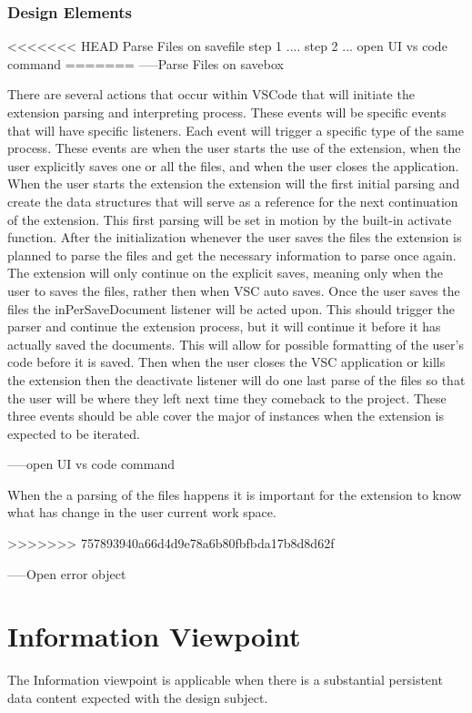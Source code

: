 \documentclass[letterpaper,10pt,titlepage,draftclsnofoot,onecolumn,onesided] {IEEEtran}
\begin{document}
\subsubsection{Design Elements}
<<<<<<< HEAD
	Parse Files on savefile
		step 1 ....
		step 2 ...
	open UI vs code command
=======
	-----Parse Files on savebox
	
There are several actions that occur within VSCode that will initiate the extension parsing and interpreting process.
These events will be specific events that will have specific listeners. 
Each event will trigger a specific type of the same process.
These events are when the user starts the use of the extension, when the user explicitly saves one or all the files, and when the user closes the application.
When the user starts the extension the extension will the first initial parsing and create the data structures that will serve as a reference for the next continuation of the extension.
This first parsing will be set in motion by the built-in activate function. 
After the initialization whenever the user saves the files the extension is planned to parse the files and get the necessary information to parse once again. 
The extension will only continue on the explicit saves, meaning only when the user to saves the files, rather then when VSC auto saves. 
Once the user saves the files the inPerSaveDocument listener will be acted upon.
This should trigger the parser and continue the extension process, but it will continue it before it has actually saved the documents. 
This will allow for possible formatting of the user's code before it is saved.
Then when the user closes the VSC application or kills the extension then the deactivate listener will do one last parse of the files so that the user will be where they left next time they comeback to the project.
These three events should be able cover the major of instances when the extension is expected to be iterated.


	-----open UI vs code command
	
When the a parsing of the files happens it is important for the extension to know what has change in the user current work space. 
	
>>>>>>> 757893940a66d4d9e78a6b80fbfbda17b8d8d62f
	
	-----Open error object
	
	
\section{Information Viewpoint}
The Information viewpoint is applicable when there is a substantial persistent data content expected with
the design subject. 
\end{document}
